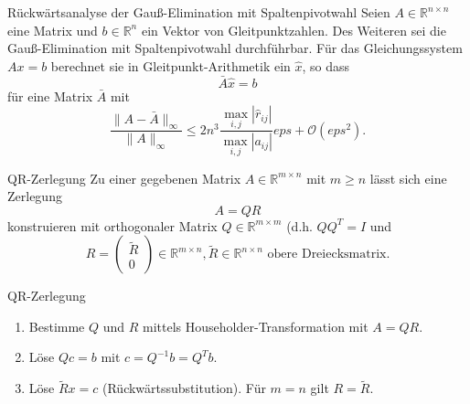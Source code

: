 \begin{flashcard}[Satz]{Rückwärtsanalyse der Gauß-Elimination mit Spaltenpivotwahl}
	Seien $A \in \mathbb{R}^{n \times n}$ eine Matrix und $b \in \mathbb{R}^n$ ein Vektor von Gleitpunktzahlen.
	Des Weiteren sei die Gauß-Elimination mit Spaltenpivotwahl durchführbar.
	Für das Gleichungssystem $Ax = b$ berechnet sie in Gleitpunkt-Arithmetik ein $\hat{x}$, so dass
	$$ \bar{A}\hat{x} = b $$
	für eine Matrix $\bar{A}$ mit
	$$ \frac{\|A - \bar{A}\|_\infty}{\|A\|_\infty} \leq 2 n^3 \frac{\max_{i,j} |\hat{r}_{ij}|}{\max_{i,j} |a_{ij}|} eps + \mathcal{O}(eps^2).$$
\end{flashcard}

\begin{flashcard}[Definition]{QR-Zerlegung}
	Zu einer gegebenen Matrix $A \in \mathbb{R}^{m \times n}$ mit $m \geq n$ lässt sich eine Zerlegung
	$$ A = QR $$
	konstruieren mit orthogonaler Matrix $Q \in \mathbb{R}^{m \times m}$ (d.h. $QQ^T = I$ und
$$ R = \begin{pmatrix}\tilde{R}\\0\end{pmatrix} \in \mathbb{R}^{m \times n}, \tilde{R} \in \mathbb{R}^{n \times n} \text{ obere Dreiecksmatrix.}$$
\end{flashcard}

\begin{flashcard}[Algorithmus]{QR-Zerlegung}
	\begin{enumerate}
		\item Bestimme $Q$ und $R$ mittels Householder-Transformation mit $A = QR$.
		\item Löse $Qc = b$ mit $c = Q^{-1} b = Q^T b$.
		\item Löse $\tilde{R}x = c$ (Rückwärtssubstitution). Für $m = n$ gilt $R = \tilde{R}$.
	\end{enumerate}
\end{flashcard}
